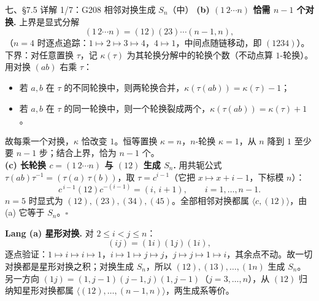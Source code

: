 \documentclass[aspectratio=169,10pt,fontset=none]{ctexbeamer}
\newcommand{\key}[1]{\textcolor{ink}{\bfseries #1}}
\begin{document}
\begin{frame}[t]{七、\S7.5 详解 1/7：G208 相邻对换生成 $S_n$（中）}
\scriptsize
\setlength{\parskip}{1pt}
\key{(b) $(1\,2\cdots n)$ 恰需 $n-1$ 个对换.} 上界是显式分解
\[ (1\,2\cdots n)=(12)(23)\cdots(n-1,n), \]
（$n=4$ 时逐点追踪：$1\mapsto2\mapsto3\mapsto4$，$4\mapsto1$，中间点随链移动，即 $(1234)$）。\\
下界：对任意置换 $\tau$，记 $\kappa(\tau)$ 为其轮换分解中的轮换个数（不动点算 $1$-轮换）。用对换 $(ab)$ 右乘 $\tau$：
\begin{itemize}\setlength{\itemsep}{0pt}\setlength{\parskip}{0pt}
  \item 若 $a,b$ 在 $\tau$ 的不同轮换中，则两轮换合并，$\kappa(\tau(ab))=\kappa(\tau)-1$；
  \item 若 $a,b$ 在 $\tau$ 的同一轮换中，则一个轮换裂成两个，$\kappa(\tau(ab))=\kappa(\tau)+1$。
\end{itemize}
故每乘一个对换，$\kappa$ 恰改变 $1$。恒等置换 $\kappa=n$，$n$-轮换 $\kappa=1$，从 $n$ 降到 $1$ 至少要 $n-1$ 步；结合上界，恰为 $n-1$ 个。\\
\key{(c) 长轮换 $c=(1\,2\cdots n)$ 与 $(12)$ 生成 $S_n$.} 用共轭公式 $\tau(ab)\tau^{-1}=(\tau(a)\,\tau(b))$，取 $\tau=c^{i-1}$（它把 $x\mapsto x+i-1$，下标模 $n$）：
\[ c^{\,i-1}(12)c^{-(i-1)}=(i,\,i+1),\qquad i=1,\ldots,n-1. \]
$n=5$ 时显式为 $(12),(23),(34),(45)$。全部相邻对换都属 $\langle c,(12)\rangle$，由 (a) 它等于 $S_n$。$\square$

\key{Lang (a) 星形对换.} 对 $2\le i<j\le n$：
\[ (ij)=(1i)(1j)(1i), \]
逐点验证：$1\mapsto i\mapsto i\mapsto1$，$i\mapsto1\mapsto j\mapsto j$，$j\mapsto j\mapsto1\mapsto i$，其余点不动。故一切对换都是星形对换之积；对换生成 $S_n$，所以 $(12),(13),\ldots,(1n)$ 生成 $S_n$。另一方向 $(1j)=(1,j-1)(j-1,j)(1,j-1)$（$j=3,\ldots,n$），从 $(12)$ 归纳知星形对换都属 $\langle(12),\ldots,(n-1,n)\rangle$，两生成系等价。
\end{frame}
\end{document}
